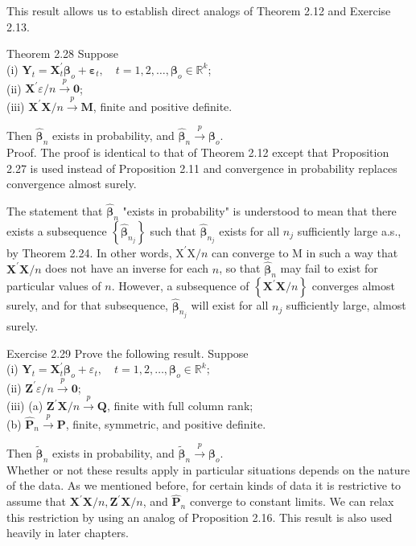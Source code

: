 \documentclass[10pt]{article}
\begin{document}
This result allows us to establish direct analogs of Theorem 2.12 and Exercise 2.13.

Theorem 2.28 Suppose\\
(i) $\mathbf{Y}_{t}=\mathbf{X}_{t}^{\prime} \boldsymbol{\beta}_{o}+\boldsymbol{\varepsilon}_{t}, \quad t=1,2, \ldots, \boldsymbol{\beta}_{o} \in \mathbb{R}^{k}$;\\
(ii) $\mathbf{X}^{\prime} \varepsilon / n \xrightarrow{p} \mathbf{0}$;\\
(iii) $\mathbf{X}^{\prime} \mathbf{X} / n \xrightarrow{p} \mathbf{M}$, finite and positive definite.

Then $\hat{\boldsymbol{\beta}}_{n}$ exists in probability, and $\hat{\boldsymbol{\beta}}_{n} \xrightarrow{p} \boldsymbol{\beta}_{o}$.\\
Proof. The proof is identical to that of Theorem 2.12 except that Proposition 2.27 is used instead of Proposition 2.11 and convergence in probability replaces convergence almost surely.

The statement that $\hat{\boldsymbol{\beta}}_{n}$ "exists in probability" is understood to mean that there exists a subsequence $\left\{\hat{\boldsymbol{\beta}}_{n_{j}}\right\}$ such that $\hat{\boldsymbol{\beta}}_{n_{j}}$ exists for all $n_{j}$ sufficiently large a.s., by Theorem 2.24. In other words, $\mathrm{X}^{\prime} \mathrm{X} / n$ can converge to M in such a way that $\mathbf{X}^{\prime} \mathbf{X} / n$ does not have an inverse for each $n$, so that $\hat{\boldsymbol{\beta}}_{n}$ may fail to exist for particular values of $n$. However, a subsequence of $\left\{\mathbf{X}^{\prime} \mathbf{X} / n\right\}$ converges almost surely, and for that subsequence, $\hat{\boldsymbol{\beta}}_{n_{j}}$ will exist for all $n_{j}$ sufficiently large, almost surely.

Exercise 2.29 Prove the following result. Suppose\\
(i) $\mathbf{Y}_{t}=\mathbf{X}_{t}^{\prime} \boldsymbol{\beta}_{o}+\varepsilon_{t}, \quad t=1,2, \ldots, \boldsymbol{\beta}_{o} \in \mathbb{R}^{k} ;$\\
(ii) $\mathbf{Z}^{\prime} \varepsilon / n \xrightarrow{p} \mathbf{0}$;\\
(iii) (a) $\mathbf{Z}^{\prime} \mathbf{X} / n \xrightarrow{p} \mathbf{Q}$, finite with full column rank;\\
(b) $\hat{\mathbf{P}}_{n} \xrightarrow{p} \mathbf{P}$, finite, symmetric, and positive definite.

Then $\tilde{\boldsymbol{\beta}}_{n}$ exists in probability, and $\tilde{\boldsymbol{\beta}}_{n} \xrightarrow{p} \boldsymbol{\beta}_{o}$.\\
Whether or not these results apply in particular situations depends on the nature of the data. As we mentioned before, for certain kinds of data it is restrictive to assume that $\mathbf{X}^{\prime} \mathbf{X} / n, \mathbf{Z}^{\prime} \mathbf{X} / n$, and $\hat{\mathbf{P}}_{n}$ converge to constant limits. We can relax this restriction by using an analog of Proposition 2.16. This result is also used heavily in later chapters.
\end{document}
